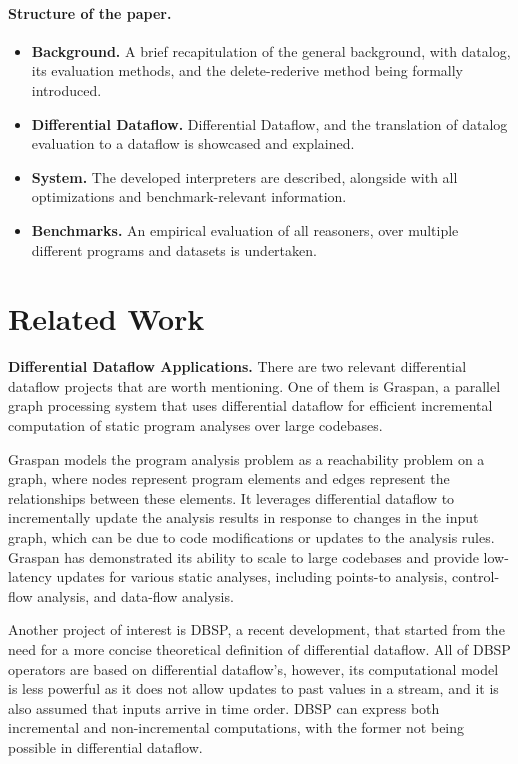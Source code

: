 \documentclass[sigconf,screen,review,natbib]{acmart}
\theoremstyle{definition}
\begin{document}
\paragraph{Structure of the paper.}
\begin{itemize}
	\item{\textbf{Background.}} A brief recapitulation of the general background, with datalog, its evaluation
	methods, and the delete-rederive method being formally introduced.
	\item{\textbf{Differential Dataflow.}} Differential Dataflow, and the translation of datalog evaluation to
	a dataflow is showcased and explained.
	\item{\textbf{System.}} The developed interpreters are described, alongside with all optimizations and
	benchmark-relevant information.
	\item{\textbf{Benchmarks.}} An empirical evaluation of all reasoners, over multiple different programs and
	datasets is undertaken.
\end{itemize}
\section{Related Work}

\textbf{Differential Dataflow Applications.} There are two relevant differential dataflow projects that are worth
mentioning. One of them is Graspan, a parallel graph processing system that uses differential dataflow for efficient
incremental computation of static program analyses over large codebases.

Graspan models the program analysis problem as a reachability problem on a graph, where nodes represent program elements
and edges represent the relationships between these elements. It leverages differential dataflow to incrementally update
the analysis results in response to changes in the input graph, which can be due to code modifications or updates to
the analysis rules. Graspan has demonstrated its ability to scale to large codebases and provide low-latency updates
for various static analyses, including points-to analysis, control-flow analysis, and data-flow analysis.

Another project of interest is DBSP\cite{dbsp}, a recent development, that started from the need for a more concise
theoretical definition of differential dataflow. All of DBSP operators are based on differential dataflow's, however, its
computational model is less powerful as it does not allow updates to past values in a stream, and it is also assumed that
inputs arrive in time order. DBSP can express both incremental and non-incremental computations, with the former not being
possible in differential dataflow.
\end{document}
